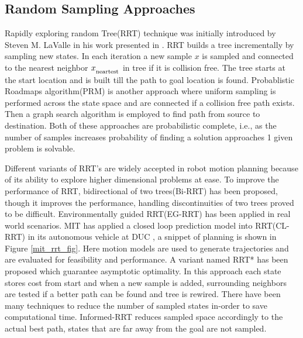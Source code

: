\subsection{Random Sampling Approaches}
\label{rw_incremental_search}
Rapidly exploring random Tree(RRT) technique was initially introduced by Steven M. LaValle in his work presented in \cite{Lavalle_rrt}. RRT builds a tree incrementally by sampling new states. In each iteration a new sample $x$ is sampled and connected to the nearest neighbor $x_\textsubscript{neartest}$ in tree if it is collision free. The tree starts at the start location and is built till the path to goal location is found. Probablistic Roadmaps algorithm\cite{prm}(PRM) is another approach where uniform sampling is performed across the state space and are connected if a collision free path exists. Then a graph search algorithm is employed to find path from source to destination. Both of these approaches are probabilistic complete, i.e., as the number of samples increases probability of finding a solution approaches 1 given problem is solvable. 

Different variants of RRT's are widely accepted in robot motion planning because of its ability to explore higher dimensional problems at ease\cite{rrt_higher_dimension}. To improve the performance of RRT, bidirectional of two trees(Bi-RRT) has been proposed, though it improves the performance, handling discontinuities of two trees proved to be difficult\cite{birrt}. Environmentally guided RRT(EG-RRT) has been applied in real world scenarios\cite{egrrt}. MIT has applied a closed loop prediction model into RRT(CL-RRT) in its autonomous vehicle at DUC \cite{mit_rrt}, a snippet of planning is shown in Figure \ref{mit_rrt_fig}. Here motion models are used to generate trajectories and are evaluated for feasibility and performance. A variant named RRT* \cite{rrt_star} has been proposed which guarantee asymptotic optimality.  In this approach each state stores cost from start and when a new sample is added, surrounding neighbors are tested if a better path can be found and tree is rewired. There have been many techniques to reduce the number of sampled states in-order to save computational time. Informed-RRT \cite{informed_rrt} reduces sampled space accordingly to the actual best path, states that are far away from the goal are not sampled.

